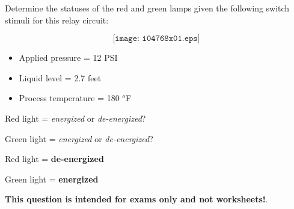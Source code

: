 

Determine the statuses of the red and green lamps given the following switch stimuli for this relay circuit:

$$\texttt{[image: i04768x01.eps]}$$

\begin{itemize}
\item{} Applied pressure = 12 PSI
\item{} Liquid level = 2.7 feet
\item{} Process temperature = 180 $^{o}$F
\end{itemize}

\vskip 10pt

Red light = {\it energized} or {\it de-energized}?

\vskip 10pt

Green light = {\it energized} or {\it de-energized}?







Red light = {\bf de-energized}

Green light = {\bf energized}







{\bf This question is intended for exams only and not worksheets!}.


